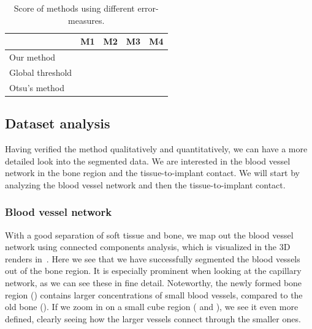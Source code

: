 \begin{table}[]
\begin{center}
\caption{Score of methods using different error-measures.}
\label{tab:scores}
\begin{tabular}{l|l|l|l|l|}
\cline{2-5}
                                       & M1 & M2 & M3 & M4 \\ \hline
\multicolumn{1}{|l|}{Our method}       &    &    &    &    \\ \hline
\multicolumn{1}{|l|}{Global threshold} &    &    &    &    \\ \hline
\multicolumn{1}{|l|}{Otsu's method}    &    &    &    &    \\ \hline
\end{tabular}
\end{center}
\end{table}

\subsection{Dataset analysis}

Having verified the method qualitatively and quantitatively, we can have a more
detailed look into the segmented data. We are interested in the blood vessel
network in the bone region and the tissue-to-implant contact. We will start by
analyzing the blood vessel network and then the tissue-to-implant contact.

\subsubsection{Blood vessel network}
\label{sec:blood-network}

With a good separation of soft tissue and bone, we map out the blood vessel
network using connected components analysis, which is visualized in the 3D
renders in~. Here we see that we have successfully
segmented the blood vessels out of the bone region. It is especially prominent
when looking at the capillary network, as we can see these in fine detail.
Noteworthy, the newly formed bone region () contains
larger concentrations of small blood vessels, compared to the old bone
(). If we zoom in on a small cube region
( and ), we see it even more
defined, clearly seeing how the larger vessels connect through the smaller
ones.

